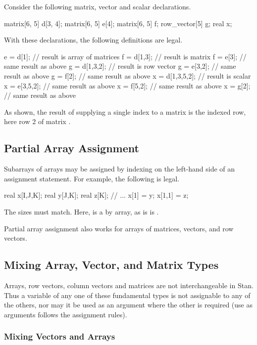 Consider the following matrix, vector and scalar declarations.
%
\begin{stancode}
matrix[6, 5] d[3, 4];
matrix[6, 5] e[4];
matrix[6, 5] f;
row_vector[5] g;
real x;
\end{stancode}
%
With these declarations, the following definitions are legal.
%
\begin{stancode}
e = d[1];        // result is array of matrices
f = d[1,3];      // result is matrix
f = e[3];        //   same result as above
g = d[1,3,2];    // result is row vector
g = e[3,2];      //   same result as above
g = f[2];        //   same result as above
x = d[1,3,5,2];  // result is scalar
x = e[3,5,2];    //   same result as above
x = f[5,2];      //   same result as above
x = g[2];        //   same result as above
\end{stancode}
%
As shown, the result  of supplying a single index to a
matrix is the indexed row, here row 2 of matrix .


\subsection{Partial Array Assignment}

Subarrays of arrays may be assigned by indexing on the left-hand side
of an assignment statement.  For example, the following is legal.
%
\begin{stancode}
real x[I,J,K];
real y[J,K];
real z[K];
// ...
x[1] = y;
x[1,1] = z;
\end{stancode}
%
The sizes must match.  Here,  is a  by 
array, as is is .

Partial array assignment also works for arrays of matrices, vectors,
and row vectors.


\subsection{Mixing Array, Vector, and Matrix Types}

Arrays, row vectors, column vectors and matrices are not
interchangeable in Stan.  Thus a variable of any one of these
fundamental types is not assignable to any of the others, nor may it
be used as an argument where the other is required (use as arguments
follows the assignment rules).



\subsubsection{Mixing Vectors and Arrays}

